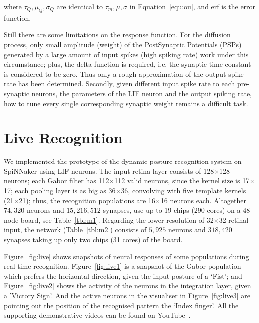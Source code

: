 where $\tau_Q, \mu_Q, \sigma_Q$ are identical to $\tau_m, \mu, \sigma$ in Equation~\ref{equ:ou}, and erf is the error function.

Still there are some limitations on the response function. 
For the diffusion process, only small amplitude (weight) of the PostSynaptic Potentials (PSPs) generated by a large amount of input spikes (high spiking rate) work under this circumstance; 
plus, the delta function is required, i.e. the synaptic time constant is considered to be zero. Thus only a rough approximation of the output spike rate has been determined.
Secondly, given different input spike rate to each pre-synaptic neurons, the parameters of the LIF neuron and the output spiking rate, how to tune every single corresponding synaptic weight remains a difficult task.


\section{Live Recognition}
We implemented the prototype of the dynamic posture recognition system on SpiNNaker using LIF neurons. 
The input retina layer consists of 128$\times$128 neurons; 
each Gabor filter has 112$\times$112 valid neurons, since the kernel size is 17$\times$17; 
each pooling layer is as big as 36$\times$36, convolving with five template kernels (21$\times$21); 
thus, the recognition populations are 16$\times$16 neurons each. Altogether $74,320$ neurons and $15,216,512$ synapses, use up to 19 chips (290 cores) on a 48-node board, see Table~\ref{tbl:m1}. Regarding the lower resolution of 32$\times$32 retinal input, the network (Table~\ref{tbl:m2}) consists of $5,925$ neurons and $318,420$ synapses taking up only two chips (31 cores) of the board.

Figure~\ref{fig:live} shows snapshots of neural responses of some populations during real-time recognition.
Figure~\ref{fig:live1} is a snapshot of the Gabor population which prefers the horizontal direction, given the input posture of a `Fist'; and Figure~\ref{fig:live2} shows the activity of the neurons in the integration layer, given a 'Victory Sign'.
And the active neurons in the visualiser in Figure~\ref{fig:live3} are pointing out the position of the recognised pattern the `Index finger'. 
All the supporting demonstrative videos can be found on YouTube~\cite{video1, video2, video3}. %

